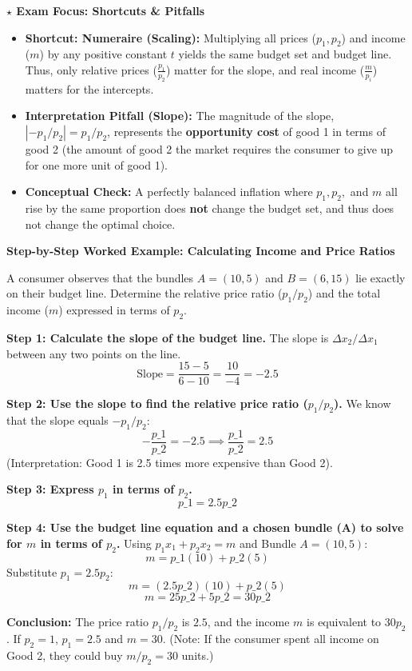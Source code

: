 \documentclass{article}
\begin{document}
\textbf{$\star$ Exam Focus: Shortcuts \& Pitfalls}

\begin{itemize}
    \item \textbf{Shortcut: Numeraire (Scaling):} Multiplying all prices ($p_1, p_2$) and income ($m$) by any positive constant $t$ yields the same budget set and budget line. Thus, only relative prices ($\frac{p_1}{p_2}$) matter for the slope, and real income ($\frac{m}{p_i}$) matters for the intercepts.
    \item \textbf{Interpretation Pitfall (Slope):} The magnitude of the slope, $|-p_1/p_2| = p_1/p_2$, represents the \textbf{opportunity cost} of good 1 in terms of good 2 (the amount of good 2 the market requires the consumer to give up for one more unit of good 1).
    \item \textbf{Conceptual Check:} A perfectly balanced inflation where $p_1, p_2,$ and $m$ all rise by the same proportion does \textbf{not} change the budget set, and thus does not change the optimal choice.
\end{itemize}

\textbf{Step-by-Step Worked Example: Calculating Income and Price Ratios}

A consumer observes that the bundles $A=(10, 5)$ and $B=(6, 15)$ lie exactly on their budget line. Determine the relative price ratio ($p_1/p_2$) and the total income ($m$) expressed in terms of $p_2$.

\textbf{Step 1: Calculate the slope of the budget line.} The slope is $\Delta x_2 / \Delta x_1$ between any two points on the line. $$\text{Slope} = \frac{15 - 5}{6 - 10} = \frac{10}{-4} = -2.5$$

\textbf{Step 2: Use the slope to find the relative price ratio ($p_1/p_2$).} We know that the slope equals $-p_1/p_2$: $$-\frac{p\_1}{p\_2} = -2.5 \implies \frac{p\_1}{p\_2} = 2.5$$ (Interpretation: Good 1 is 2.5 times more expensive than Good 2).

\textbf{Step 3: Express $p_1$ in terms of $p_2$.} $$p\_1 = 2.5 p\_2$$

\textbf{Step 4: Use the budget line equation and a chosen bundle (A) to solve for $m$ in terms of $p_2$.} Using $p_1x_1 + p_2x_2 = m$ and Bundle $A=(10, 5)$: $$m = p\_1(10) + p\_2(5)$$ Substitute $p_1 = 2.5 p_2$: $$m = (2.5 p\_2)(10) + p\_2(5)$$ $$m = 25 p\_2 + 5 p\_2 = 30 p\_2$$

\textbf{Conclusion:} The price ratio $p_1/p_2$ is $2.5$, and the income $m$ is equivalent to $30 p_2$. If $p_2=1$, $p_1=2.5$ and $m=30$. (Note: If the consumer spent all income on Good 2, they could buy $m/p_2 = 30$ units.)
\end{document}
